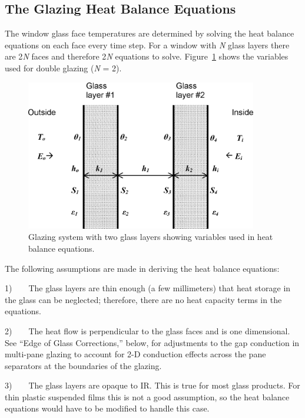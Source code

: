 \subsection{The Glazing Heat Balance Equations}\label{the-glazing-heat-balance-equations}

The window glass face temperatures are determined by solving the heat balance equations on each face every time step. For a window with \emph{N} glass layers there are 2\emph{N} faces and therefore 2\emph{N} equations to solve. Figure~\ref{fig:glazing-system-with-two-glass-layers-showing} shows the variables used for double glazing (\emph{N} = 2).

\begin{figure}[hbtp] %
\centering
\includegraphics[width=0.9\textwidth, height=0.9\textheight, keepaspectratio=true]{media/image1470.png}
\caption{  Glazing system with two glass layers showing variables used in heat balance equations. \protect \label{fig:glazing-system-with-two-glass-layers-showing}}
\end{figure}

The following assumptions are made in deriving the heat balance equations:

1)~~~~The glass layers are thin enough (a few millimeters) that heat storage in the glass can be neglected; therefore, there are no heat capacity terms in the equations.

2)~~~~The heat flow is perpendicular to the glass faces and is one dimensional. See ``Edge of Glass Corrections,'' below, for adjustments to the gap conduction in multi-pane glazing to account for 2-D conduction effects across the pane separators at the boundaries of the glazing.

3)~~~~The glass layers are opaque to IR. This is true for most glass products. For thin plastic suspended films this is not a good assumption, so the heat balance equations would have to be modified to handle this case.

